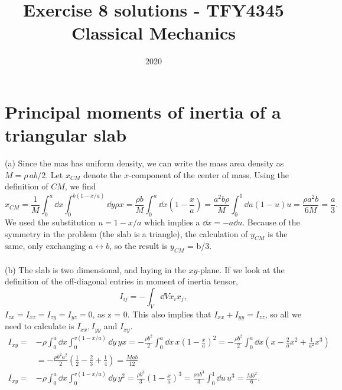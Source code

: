 \documentclass{article}
\title{Exercise 8 solutions - TFY4345 Classical Mechanics}
\date{2020}
\begin{document}
    \maketitle
    \section{Principal moments of inertia of a triangular slab}
        (a) Since the mas has uniform density, we can write the mass area density as $M =   \rho \, ab/2$. Let $x_{CM}$ denote the $x$-component of the center of mass. Using the definition of $CM$, we find
        \begin{equation*}
            x_{CM} = \frac{1}{M} \int_0^a \dd x \int_0^{b(1 - x / a)} \dd y \rho x = \frac{\rho b}{M} \int_0^a \dd x \left( 1 - \frac{x}{a}\right) = \frac{a^2 b \rho}{M} \int_0^1 \dd u (1 - u)u = \frac{\rho a^2 b}{6M} = \frac{a}{3}. 
        \end{equation*}
        We used the substitution $u = 1 - x/a$ which implies a $ \dd x = - a \dd u $. Because of the symmetry in the problem (the slab is a triangle), the calculation of $y_{CM}$ is the same, only exchanging $ a \leftrightarrow b $, so the result is $y_{CM}$ = b/3. 
        \\ \\
        (b) The slab is two dimensional, and laying in the $xy$-plane. If we look at the definition of the off-diagonal entries in moment of inertia tensor,
        \begin{equation*}
            I_{ij} = - \int_V \dd V x_ix_j,
        \end{equation*} $I_{zx} = I_{xz} = I_{zy} = I_{yz} = 0$, as  z = 0. This also implies that $I_{xx} + I_{yy} = I_{zz}$, so all we need to calculate is $I_{xx}, I_{yy}$ and $I_{xy}$.
        \begin{align*}
            I_{xy} =& -\rho \int_0^a \dd x \int_0^{v(1 - x/a)} \dd y \, yx 
            = - \frac{\rho b^2}{2}\int_0^a \dd x\, x \left( 1 - \frac{x}{a} \right)^2 
            = - \frac{\rho b^2}{2} \int_0^a \dd x \left( x - \frac{2}{a}x^2 + \frac{1}{a^2} x^3\right) \\
            &= -\frac{\rho b^2 a^2}{2}\left( \frac{1}{2} - \frac{2}{3} + \frac{1}{4} \right) = \frac{M a b}{12} \\
            I_{xy} = & -\rho \int_0^a \dd x \int_0^{v(1 - x/a)} \dd y \,y^2 
            = \frac{\rho b^3}{3} \left(1 - \frac{x}{a}\right)^3 = \frac{\rho a b^3}{3} \int_0^1 \dd u \,u^3 = \frac{M b^2}{6}.
        \end{align*} 
\end{document}
